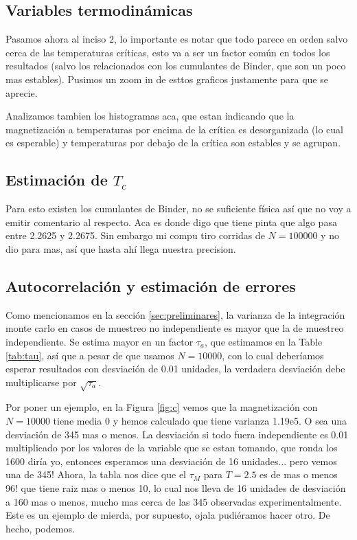 \documentclass[a4paper,12pt]{article}
\begin{document}
\subsection{Variables termodinámicas}

Pasamos ahora al inciso 2, lo importante es notar que todo parece en orden salvo cerca de las temperaturas críticas, esto va a ser un factor común en todos los resultados (salvo los relacionados con los cumulantes de Binder, que son un poco mas estables). Pusimos un zoom in de esttos graficos justamente para que se aprecie.

Analizamos tambien los histogramas aca, que estan indicando que la magnetización a temperaturas por encima de la crítica es desorganizada (lo cual es esperable) y temperaturas por debajo de la crítica son estables y se agrupan.

\subsection{Estimación de $T_c$}

Para esto existen los cumulantes de Binder, no se suficiente física así que no voy a emitir comentario al respecto. Aca es donde digo que tiene pinta que algo pasa entre 2.2625 y 2.2675. Sin embargo mi compu tiro corridas de $N = 100000$ y no dio para mas, así que hasta ahí llega nuestra precision.

\subsection{Autocorrelación y estimación de errores}

Como mencionamos en la sección \ref{sec:preliminares}, la varianza de la integración monte carlo en casos de muestreo no independiente es mayor que la de muestreo independiente. Se estima mayor en un factor $\tau_a$, que estimamos en la Table \ref{tab:tau}, así que a pesar de que usamos $N = 10000$, con lo cual deberíamos esperar resultados con desviación de 0.01 unidades, la verdadera desviación debe multiplicarse por $\sqrt{\tau_a}$.

Por poner un ejemplo, en la Figura \ref{fig:c} vemos que la magnetización con $N = 10000$ tiene media 0 y hemos calculado que tiene varianza 1.19e5. O sea una desviación de 345 mas o menos. La desviación si todo fuera independiente es 0.01 multiplicado por los valores de la variable que se estan tomando, que ronda los 1600 diría yo, entonces esperamos una desviación de 16 unidades... pero vemos una de 345! Ahora, la tabla nos dice que el $\tau_M$ para $T = 2.5$ es de mas o menos 96! que tiene raiz mas o menos 10, lo cual nos lleva de 16 unidades de desviación a 160 mas o menos, mucho mas cerca de las 345 observadas experimentalmente. Este es un ejemplo de mierda, por supuesto, ojala pudiéramos hacer otro. De hecho, podemos.
\end{document}
